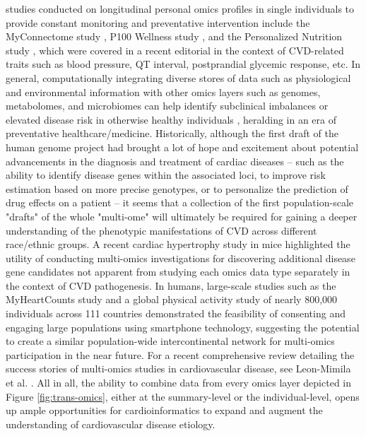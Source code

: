 \documentclass[letter]{bib}
\begin{document}
studies conducted on longitudinal personal omics profiles in single individuals to provide constant monitoring and preventative intervention include the MyConnectome study \citep{Poldrack:2015:Long-term}, P100 Wellness study \citep{Price:2017:Wellness}, and the Personalized Nutrition study \citep{Zeevi:2015:Personalized}, which were covered in a recent editorial \citep{Lau:2018:Omics} in the context of CVD-related traits such as blood pressure, QT interval, postprandial glycemic response, etc.  In general, computationally integrating diverse stores of data such as physiological and environmental information with other omics layers such as genomes, metabolomes, and microbiomes can help identify subclinical imbalances or elevated disease risk in otherwise healthy individuals \citep{Lau:2018:Omics}, heralding in an era of preventative healthcare/medicine.  Historically, although the first draft of the human genome project had brought a lot of hope and excitement about potential advancements in the diagnosis and treatment of cardiac diseases -- such as the ability to identify disease genes within the associated loci, to improve risk estimation based on more precise genotypes, or to personalize the prediction of drug effects on a patient \citep{Komajda:2001:heart} -- it seems that a collection of the first population-scale "drafts" of the whole "multi-ome" will ultimately be required for gaining a deeper understanding of the phenotypic manifestations of CVD across different race/ethnic groups.  A recent cardiac hypertrophy study in mice \citep{Lau:2018:integrated} highlighted the utility of conducting multi-omics investigations for discovering additional disease gene candidates not apparent from studying each omics data type separately in the context of CVD pathogenesis.  In humans, large-scale studies such as the MyHeartCounts study \citep{McConnell:2017:Feasibility} and a global physical activity study of nearly 800,000 individuals across 111 countries \citep{Althoff:2017:Large} demonstrated the feasibility of consenting and engaging large populations using smartphone technology, suggesting the potential to create a similar population-wide intercontinental network for multi-omics participation in the near future.  For a recent comprehensive review detailing the success stories of multi-omics studies in cardiovascular disease, see Leon-Mimila et al. \cite{Leon-Mimila:2019:Relevance}.  All in all, the ability to combine data from every omics layer depicted in Figure \ref{fig:trans-omics}, either at the summary-level or the individual-level, opens up ample opportunities for cardioinformatics to expand and augment the understanding of cardiovascular disease etiology.
	
\end{document}
